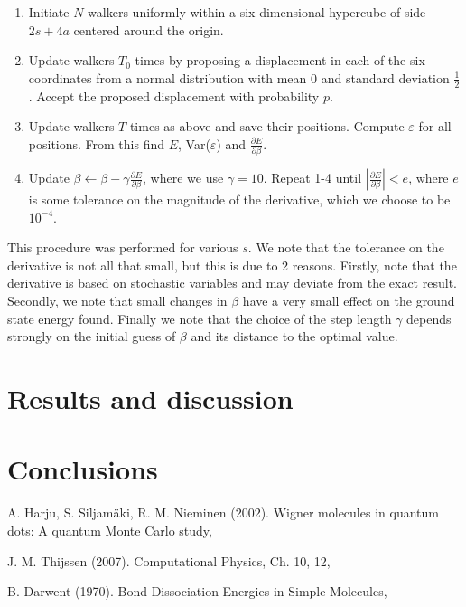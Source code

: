 \documentclass[twoside]{article}
\begin{document}
\begin{enumerate}
	\item Initiate $N$ walkers uniformly within a six-dimensional hypercube of side $2s + 4a$ centered around the origin.
	\item Update walkers $T_0$ times by proposing a displacement in each of the six coordinates from a normal distribution with mean $0$ and standard deviation $\frac{1}{2}$. Accept the proposed displacement with probability $p$.
	\item Update walkers $T$ times as above and save their positions. Compute $\varepsilon$ for all positions. From this find $E$, Var($\varepsilon$) and $\frac{\partial E}{\partial \beta}$.
	\item Update $\beta \leftarrow \beta - \gamma \frac{\partial E}{\partial \beta}$, where we use $\gamma = 10$. Repeat 1-4 until $|\frac{\partial E}{\partial \beta}| < e$, where $e$ is some tolerance on the magnitude of the derivative, which we choose to be $10^{-4}$.
\end{enumerate}
This procedure was performed for various $s$. We note that the tolerance on the derivative is not all that small, but this is due to 2 reasons. Firstly, note that the derivative is based on stochastic variables and may deviate from the exact result. Secondly, we note that small changes in $\beta$ have a very small effect on the ground state energy found. Finally we note that the choice of the step length $\gamma$ depends strongly on the initial guess of $\beta$ and its distance to the optimal value. 


\section{Results and discussion}

	
\section{Conclusions}


\begin{thebibliography}{1}
	A. Harju, S. Siljam\"aki, R. M. Nieminen (2002).
	\newblock Wigner molecules in quantum dots: A quantum Monte Carlo study,
	
	J. M. Thijssen (2007).
	\newblock Computational Physics, Ch. 10, 12,
	
	B. Darwent (1970).
	\newblock Bond Dissociation Energies in Simple Molecules,
	
\end{thebibliography}
	
\end{document}

